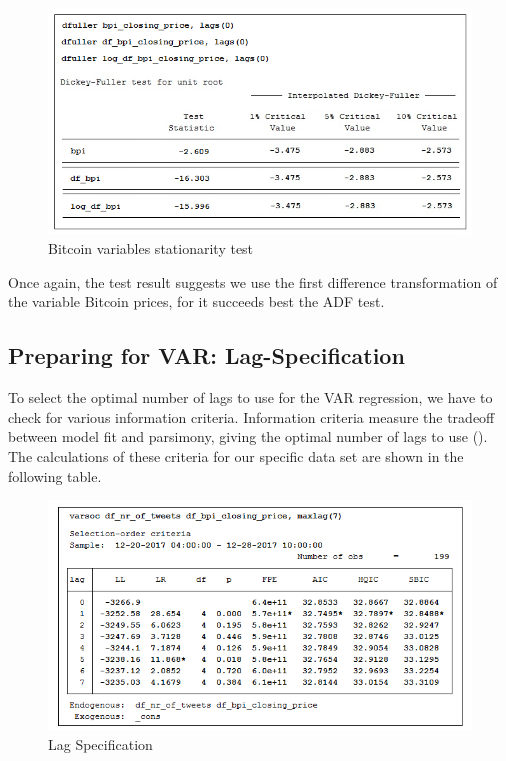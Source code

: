 \documentclass[a4paper,american,12pt]{article}
\begin{document}
\begin{spacing}{1.2}
\begin{figure}[H]
\centering
\includegraphics[scale=0.85]{stata_export_graphs/ADF_bpi_variables.png}
\caption{Bitcoin variables stationarity test}
\label{fig:4}
\end{figure}
	
Once again, the test result suggests we use the first difference transformation of the variable Bitcoin prices, for it succeeds best the ADF test.

\subsection{Preparing for VAR: Lag-Specification}
To select the optimal number of lags to use for the VAR regression, we have to check for various information criteria. Information criteria measure the tradeoff between model fit and parsimony, giving the optimal number of lags to use (\cite[p.~27]{brandtwilliams2007}). The calculations of these criteria for our specific data set are shown in the following table.\\

\begin{figure}[H]
\centering
\includegraphics[scale=0.85]{stata_export_graphs/LAG_crit_df_nr_tweets_df_bpi.png}
\caption{Lag Specification}
\label{fig:5}
\end{figure}


\end{spacing}
\end{document}

